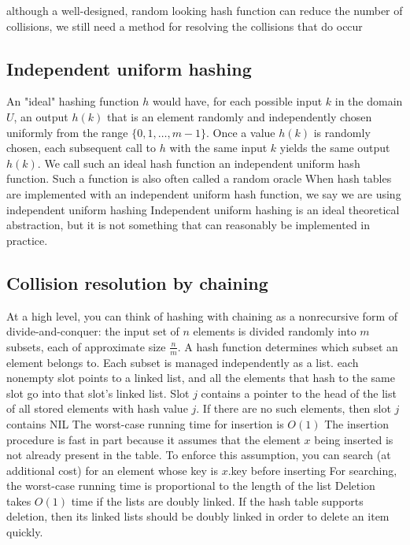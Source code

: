 \documentclass{report}
\begin{document}
\bigbreak \noindent 
{}
\bigbreak \noindent 
although a well-designed, random looking hash function can reduce the number of collisions, we still need a method for resolving the collisions that do occur
\bigbreak \noindent 
\subsection{Independent uniform hashing}
\bigbreak \noindent 
An "ideal" hashing function \( h \) would have, for each possible input \( k \) in the domain \( U \), an output \( h(k) \) that is an element randomly and independently chosen uniformly from the range \( \{0, 1, \dots, m - 1\} \). Once a value \( h(k) \) is randomly chosen, each subsequent call to \( h \) with the same input \( k \) yields the same output \( h(k) \).
\bigbreak \noindent 
We call such an ideal hash function an independent uniform hash function. Such a function is also often called a random oracle
\bigbreak \noindent 
When hash tables are implemented with an independent uniform hash function, we say we are using independent uniform hashing
\bigbreak \noindent 
Independent uniform hashing is an ideal theoretical abstraction, but it is not something that can reasonably be implemented in practice.
\bigbreak \noindent 
\subsection{Collision resolution by chaining}
\bigbreak \noindent 
At a high level, you can think of hashing with chaining as a nonrecursive form
of divide-and-conquer: the input set of $n$ elements is divided randomly into $m$
subsets, each of approximate size $\frac{n}{m}$. A hash function determines which subset
an element belongs to. Each subset is managed independently as a list.
\bigbreak \noindent 
each nonempty slot points to a linked list, and all the elements that hash to the same slot go into that slot’s linked list. Slot $j$ contains a pointer to the head of the list of all stored elements with hash value $j$.
If there are no such elements, then slot $j$ contains NIL
\bigbreak \noindent 
The worst-case running time for insertion is $O(1)$ 
The insertion procedure is fast in part because it assumes that the element $x$ being inserted is not already present in the table. To enforce this assumption, you
can search (at additional cost) for an element whose key is $x$.key before inserting
\bigbreak \noindent 
For searching, the worst-case running time is proportional to the length of the list
\bigbreak \noindent 
Deletion takes $O(1)$ time if the lists are doubly linked. If the hash table supports deletion, then its linked lists should be doubly linked in order to delete an item quickly.
\end{document}
